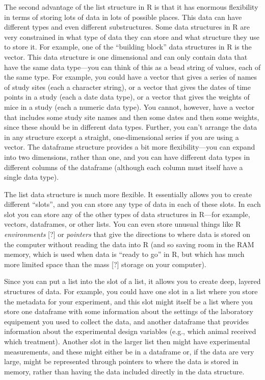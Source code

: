 \documentclass[]{tufte-book}
\begin{document}
The second advantage of the list structure in R is that it has enormous
flexibility in terms of storing lots of data in lots of possible places. This
data can have different types and even different substructures. Some data
structures in R are very constrained in what type of data they can store and
what structure they use to store it. For example, one of the ``building block''
data structures in R is the vector. This data structure is one dimensional and
can only contain data that have the same data type---you can think of this as a
bead string of values, each of the same type. For example, you could have a
vector that gives a series of names of study sites (each a character string), or
a vector that gives the dates of time points in a study (each a date data type),
or a vector that gives the weights of mice in a study (each a numeric data
type). You cannot, however, have a vector that includes some study site names
and then some dates and then some weights, since these should be in different
data types. Further, you can't arrange the data in any structure except a
straight, one-dimensional series if you are using a vector. The dataframe
structure provides a bit more flexibility---you can expand into two dimensions,
rather than one, and you can have different data types in different columns of
the dataframe (although each column must itself have a single data type).

The list data structure is much more flexible. It essentially allows you to
create different ``slots'', and you can store any type of data in each of these
slots. In each slot you can store any of the other types of data structures in
R---for example, vectors, dataframes, or other lists. You can even store unusual
things like R \emph{environments} {[}?{]} or \emph{pointers} that give the directions to where
data is stored on the computer without reading the data into R (and so saving
room in the RAM memory, which is used when data is ``ready to go'' in R, but which
has much more limited space than the mass {[}?{]} storage on your computer).

Since you can put a list into the slot of a list, it allows you to create deep,
layered structures of data. For example, you could have one slot in a list where
you store the metadata for your experiment, and this slot might itself be a list
where you store one dataframe with some information about the settings of the
laboratory equipement you used to collect the data, and another dataframe that
provides information about the experimental design variables (e.g., which animal
received which treatment). Another slot in the larger list then might have
experimental measurements, and these might either be in a dataframe or, if the
data are very large, might be represented through pointers to where the data is
stored in memory, rather than having the data included directly in the data
structure.
\end{document}
